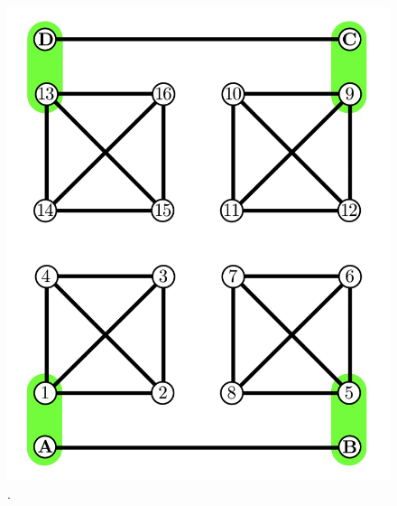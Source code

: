 \documentclass[10pt,a4paper]{book}
\numberwithin{equation}{chapter}
\numberwithin{figure}{chapter}
\numberwithin{table}{chapter}
\begin{document}
\begin{figure}[H]
    \begin{center}
        \includegraphics[scale=0.3]{GHZ4Bell.png}
    \end{center}
    \caption{\footnotesize .}
    \label{GHZ4Bell}
\end{figure}








\pagebreak
\end{document}

